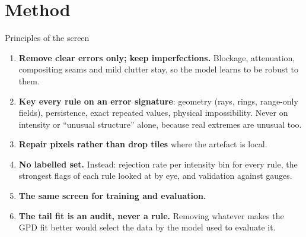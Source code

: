 \documentclass[aspectratio=169,10pt]{beamer}
\begin{document}
\section{Method}

\begin{frame}{Principles of the screen}
  \small
  \begin{enumerate}
    \item \textbf{Remove clear errors only; keep imperfections.} Blockage, attenuation,
      compositing seams and mild clutter stay, so the model learns to be robust to them.
    \item \textbf{Key every rule on an error signature}: geometry (rays, rings, range-only
      fields), persistence, exact repeated values, physical impossibility. Never on intensity
      or ``unusual structure'' alone, because real extremes are unusual too.
    \item \textbf{Repair pixels rather than drop tiles} where the artefact is local.
    \item \textbf{No labelled set.} Instead: rejection rate per intensity bin for every rule,
      the strongest flags of each rule looked at by eye, and validation against gauges.
    \item \textbf{The same screen for training and evaluation.}
    \item \textbf{The tail fit is an audit, never a rule.} Removing whatever makes the GPD fit
      better would select the data by the model used to evaluate it.
  \end{enumerate}
\end{frame}
\end{document}
